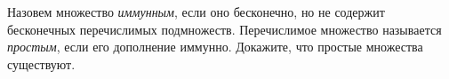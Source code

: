 Назовем множество \textit{иммунным}, если оно бесконечно, но не содержит бесконечных перечислимых подмножеств. Перечислимое
множество называется \textit{простым}, если его дополнение иммунно. Докажите, что простые множества существуют.
